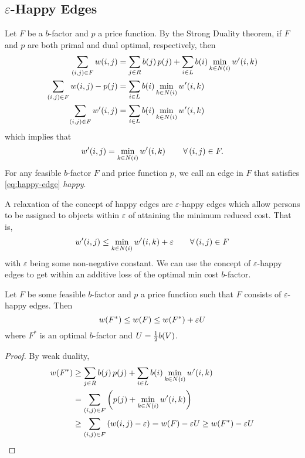 \subsection{$\varepsilon$-Happy Edges}

Let $F$ be a $b$-factor and $p$ a price function. By the Strong Duality theorem, if $F$ and $p$ are both primal and dual 
optimal, respectively, then 
\begin{align*}
    \sum_{(i, j) \in F} \f[w]{i, j} &= \sum_{j \in R}  \f[b]{j} \f[p]{j} +  \sum_{i \in L}  \f[b]{i} \min_{k \in N(i)} \f[w^\prime]{i, k}\\
    \sum_{(i, j) \in F} \f[w]{i, j} - \f[p]{j} &= \sum_{i \in L}  \f[b]{i} \min_{k \in N(i)} \f[w^\prime]{i, k}\\
    \sum_{(i, j) \in F} \f[w^\prime]{i, j} &= \sum_{i \in L}  \f[b]{i} \min_{k \in N(i)} \f[w^\prime]{i, k}
\end{align*}
which implies that
\begin{equation}
    \f[w^\prime]{i, j} =  \min_{k \in N(i)} \f[w^\prime]{i, k} \quad \quad \forall \lrp{i, j} \in F. 
    \label{eq:happy-edge}
\end{equation}
For any feasible $b$-factor $F$ and price function $p$, we call an edge in $F$ that satisfies \cref{eq:happy-edge} \emph{happy}. 

A relaxation of the concept of happy edges are $\varepsilon$-happy edges which allow persons to be assigned to objects 
within $\varepsilon$ of attaining the minimum reduced cost. That is,
\begin{equation}
    \f[w^\prime]{i, j} \leq \min_{k \in N(i)} \f[w^\prime]{i, k} + \varepsilon \quad \quad \forall \lrp{i, j} \in F
    \label{eq:epsilon-happy-edge}
\end{equation}
with $\varepsilon$ being some non-negative constant. We can use the concept of $\varepsilon$-happy edges to get within 
an additive loss of the optimal min cost $b$-factor. 

\begin{theorem}
    Let $F$ be some feasible $b$-factor and $p$ a price function such that $F$ consists of $\varepsilon$-happy edges. Then 
    \begin{equation*}
        \f[w]{F^{\ast}} \leq \f[w]{F} \leq \f[w]{F^{\ast}} + \varepsilon U
    \end{equation*}
    where $F^{\ast}$ is an optimal $b$-factor and $U = \frac{1}{2} \f[b]{V}$. 
    \label{thm:additve_loss}
\end{theorem}
\begin{proof}
    By weak duality, 
    \begin{align*}
        \f[w]{F^{\ast}} &\geq \sum_{j \in R}  \f[b]{j} \f[p]{j} +  \sum_{i \in L}  \f[b]{i} \min_{k \in N(i)} \f[w^\prime]{i, k}\\
        &= \sum_{(i, j) \in F} \lrp{\f[p]{j} + \min_{k \in N(i)} \f[w^\prime]{i, k}} \\
        &\geq  \sum_{(i, j) \in F} \lrp{\f[w]{i, j} - \varepsilon} = \f[w]{F} - \varepsilon U \geq \f[w]{F^{\ast}} - \varepsilon U
    \end{align*}
\end{proof}
